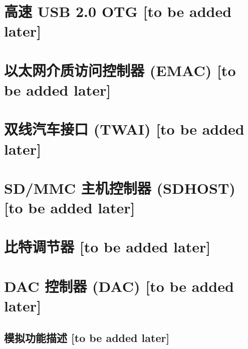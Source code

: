 \documentclass{article}
\begin{document}
\section{高速 USB 2.0 OTG [to be added later]}\label{mod:usbotghs}
\section{以太网介质访问控制器 (EMAC) [to be added later]}\label{mod:ethernetmac}
\section{双线汽车接口 (TWAI) [to be added later]}\label{mod:twai}
\section{SD/MMC 主机控制器 (SDHOST) [to be added later]}\label{mod:sdhost}
\section{比特调节器 [to be added later]}\label{mod:bitscrm}
\section{DAC 控制器 (DAC) [to be added later]}\label{mod:dac}


\label{regdesc:HPSYSCLKRSTCRYPTOCTRL0REG}
\label{fielddesc:HPSYSCLKRSTREGCRYPTORSACLKEN}
\label{fielddesc:HPSYSCLKRSTREGCRYPTORSARSTEN}

\label{fielddesc:HPSYSCLKRSTAHBPDMASYSCLKEN}
\label{fielddesc:HPSYSCLKRSTRSTENAHBPDMA}

\label{fielddesc:HPSYSCLKRSTJPEGSYSCLKEN}\label{fielddesc:HPSYSCLKRSTRSTENJPEG}


\label{fig:riscvcpu-dbg-sys-overview}

\label{regdesc:LPSYSREGLPCOREBOOTADDRREG}
\label{regdesc:LPINTRSTATUSREG}

\label{fielddesc:PMUHPTRIGGERLP}
\label{fielddesc:PMULPCPUWAKEUPEN}
\label{fielddesc:PMULPCPUSLEEPREQ}
\label{fielddesc:PMULPCPUSLPSTALLEN}
\label{fielddesc:PMULPCPUSLPBYPASSINTREN}
\label{fielddesc:PMULPCPUSLPSTALLWAIT}
\label{fielddesc:PMULPCPUSLPRESETEN}
\label{fielddesc:PMUSLPREJECTEN}
\label{fielddesc:PMUSLEEPREJECTENA}

\label{fielddesc:MCONTROLACTION}
\label{regdesc:MCONTROL}

\label{fielddesc:FASTCLKSEL}
\label{fielddesc:REGLPTSENSCLKEN}

\subsection{模拟功能描述 [to be added later]}\label{subsec:analog_func_config}
\end{document}
